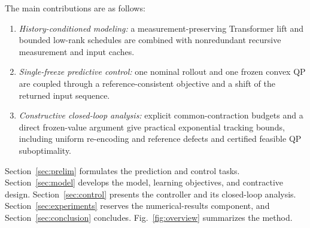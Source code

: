\documentclass[journal]{IEEEtran}
\begin{document}
The main contributions are as follows:
\begin{enumerate}
\item \emph{History-conditioned modeling:} a measurement-preserving Transformer lift and bounded low-rank schedules are combined with nonredundant recursive measurement and input caches.
\item \emph{Single-freeze predictive control:} one nominal rollout and one frozen convex QP are coupled through a reference-consistent objective and a shift of the returned input sequence.
\item \emph{Constructive closed-loop analysis:} explicit common-contraction budgets and a direct frozen-value argument give practical exponential tracking bounds, including uniform re-encoding and reference defects and certified feasible QP suboptimality.
\end{enumerate}

Section~\ref{sec:prelim} formulates the prediction and control tasks. Section~\ref{sec:model} develops the model, learning objectives, and contractive design. Section~\ref{sec:control} presents the controller and its closed-loop analysis. Section~\ref{sec:experiments} reserves the numerical-results component, and Section~\ref{sec:conclusion} concludes. Fig.~\ref{fig:overview} summarizes the method.
\end{document}
